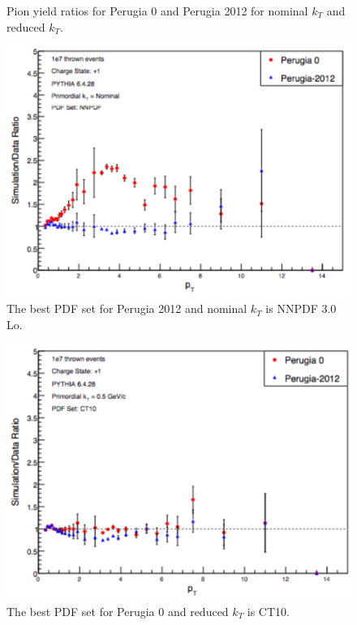 \documentclass[abstract = on,listof=totoc, bibliography=totoc]{scrreprt}
\begin{document}
\begin{figure}
\caption{Pion yield ratios for Perugia 0 and Perugia 2012 for nominal $k_T$ and reduced $k_T$.}
\label{fig:nominalPDFpythTunesBoth}
\end{figure}




\begin{figure}
\begin{center}
\includegraphics[width = .75\textwidth]{nominalKtPDFNNPDFPythTunes}
\caption[]{The best PDF set for Perugia 2012 and nominal $k_T$ is NNPDF 3.0 Lo.}
\label{fig:nominalKtPDFNNPDFPythTunes}
\end{center}
\end{figure}


\begin{figure}
\begin{center}
\includegraphics[width = .75\textwidth]{CT10PythTunes2}
\caption[]{The best PDF set for Perugia 0 and reduced $k_T$ is CT10.}
\label{fig:CT10PythTunes2}
\end{center}
\end{figure}
\end{document}
